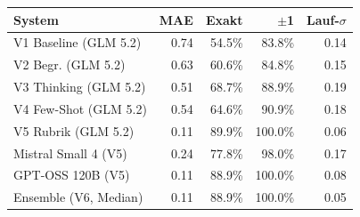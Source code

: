 \begin{tabular}{lrrrr}
\toprule
System & MAE & Exakt & $\pm$1 & Lauf-$\sigma$ \\
\midrule
V1 Baseline (GLM 5.2) & 0.74 & 54.5\% & 83.8\% & 0.14 \\
V2 Begr. (GLM 5.2) & 0.63 & 60.6\% & 84.8\% & 0.15 \\
V3 Thinking (GLM 5.2) & 0.51 & 68.7\% & 88.9\% & 0.19 \\
V4 Few-Shot (GLM 5.2) & 0.54 & 64.6\% & 90.9\% & 0.18 \\
V5 Rubrik (GLM 5.2) & 0.11 & 89.9\% & 100.0\% & 0.06 \\
\midrule
Mistral Small 4 (V5) & 0.24 & 77.8\% & 98.0\% & 0.17 \\
GPT-OSS 120B (V5) & 0.11 & 88.9\% & 100.0\% & 0.08 \\
\midrule
Ensemble (V6, Median) & 0.11 & 88.9\% & 100.0\% & 0.05 \\
\bottomrule
\end{tabular}